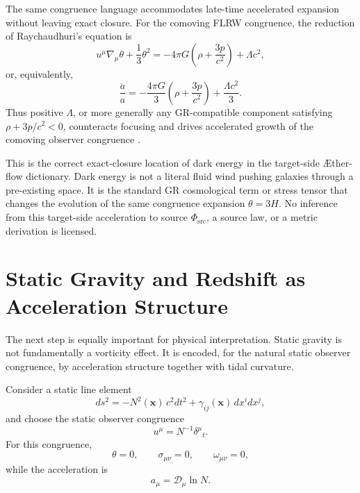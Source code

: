 \documentclass[11pt]{article}
\newcommand{\Aflow}{\AE{}ther-flow}
\newcommand{\Proj}{\mathcal{D}}
\newcommand{\PhiSrc}{\Phi_{\mathrm{src}}}
\begin{document}
The same congruence language accommodates late-time accelerated expansion without leaving exact closure. For the comoving FLRW congruence, the reduction of Raychaudhuri's equation is
\begin{equation}
u^\mu \nabla_\mu \theta
+\frac{1}{3}\theta^2
=
-4\pi G\left(\rho+\frac{3p}{c^2}\right)
+\Lambda c^2,
\label{eq:raychaudhuri_flrw_lambda}
\end{equation}
or, equivalently,
\begin{equation}
\frac{\ddot a}{a}
=
-\frac{4\pi G}{3}\left(\rho+\frac{3p}{c^2}\right)
+\frac{\Lambda c^2}{3}.
\label{eq:flrw_accel_lambda}
\end{equation}
Thus positive \(\Lambda\), or more generally any GR-compatible component satisfying \(\rho+3p/c^2<0\), counteracts focusing and drives accelerated growth of the comoving observer congruence \cite{Riess1998,Perlmutter1999,Planck2018Parameters}.

This is the correct exact-closure location of dark energy in the target-side
\Aflow{} dictionary. Dark energy is not a literal fluid wind pushing galaxies
through a pre-existing space. It is the standard GR cosmological term or
stress tensor that changes the evolution of the same congruence expansion
\(\theta=3H\). No inference from this target-side acceleration to source
\(\PhiSrc\), a source law, or a metric derivation is licensed.

\section{Static Gravity and Redshift as Acceleration Structure}

The next step is equally important for physical interpretation. Static gravity is not fundamentally a vorticity effect. It is encoded, for the natural static observer congruence, by acceleration structure together with tidal curvature.

Consider a static line element
\begin{equation}
ds^2
=
-N^2(\mathbf{x})\,c^2dt^2
+
\gamma_{ij}(\mathbf{x})\,dx^i dx^j,
\label{eq:staticmetric}
\end{equation}
and choose the static observer congruence
\begin{equation}
u^\mu = N^{-1}\delta^\mu{}_t.
\label{eq:staticu}
\end{equation}
For this congruence,
\begin{equation}
\theta=0,
\qquad
\sigma_{\mu\nu}=0,
\qquad
\omega_{\mu\nu}=0,
\label{eq:statickinematics}
\end{equation}
while the acceleration is
\begin{equation}
a_\mu = \Proj_\mu \ln N.
\label{eq:staticacceleration}
\end{equation}
\end{document}
